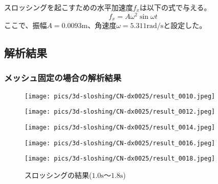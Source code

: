 スロッシングを起こすための水平加速度$f_{x}$は以下の式で与える。
\begin{equation}
	f_{x} = A \omega^2 \sin{\omega t}
\end{equation}
ここで、振幅$A=0.0093 \mathrm{m}$、角速度$\omega = 5.311 \mathrm{rad/s}$と設定した。

\newpage
\subsection{解析結果}
\subsubsection{メッシュ固定の場合の解析結果}

\begin{figure}[H]
	\centering
	\begin{minipage}[b]{0.19\columnwidth}
	    \centering
	    \texttt{[image: pics/3d-sloshing/CN-dx0025/result\_0010.jpeg]}
	\end{minipage}
	\begin{minipage}[b]{0.19\columnwidth}
	    \centering
	    \texttt{[image: pics/3d-sloshing/CN-dx0025/result\_0012.jpeg]}
	\end{minipage}
	\begin{minipage}[b]{0.19\columnwidth}
	    \centering
	    \texttt{[image: pics/3d-sloshing/CN-dx0025/result\_0014.jpeg]}
	\end{minipage}
	\begin{minipage}[b]{0.19\columnwidth}
	    \centering
	    \texttt{[image: pics/3d-sloshing/CN-dx0025/result\_0016.jpeg]}
	\end{minipage}
	\begin{minipage}[b]{0.19\columnwidth}
	    \centering
	    \texttt{[image: pics/3d-sloshing/CN-dx0025/result\_0018.jpeg]}
	\end{minipage}
	\caption{スロッシングの結果($1.0\mathrm{s}$～$1.8\mathrm{s}$)}
	\label{fig:sloshing-result}
\end{figure}
